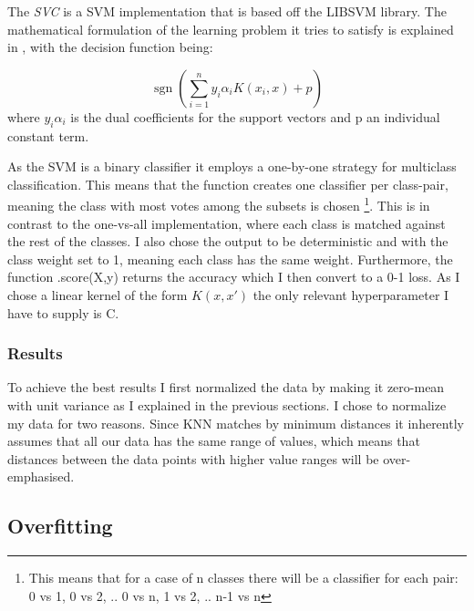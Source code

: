 \documentclass{article}
\DeclareMathOperator{\sgn}{sgn}
\theoremstyle{plain}
\theoremstyle{nonumberplain}
\begin{document}
The \textit{SVC}\cite{website:svm-sklearn} is a SVM implementation that is based off the LIBSVM \cite{website:libsvm} library.
The mathematical formulation of the learning problem it tries to satisfy is explained in \cite[1.2.7.1. SVC]{website:svm-sklearn}, with the decision function being:

\begin{equation} \label{eq7}
\sgn{(\sum_{i=1}^n y_i \alpha_i K(x_i,x) + p)}
\end{equation}
where $y_i\alpha_i$ is the dual coefficients for the support vectors and p an individual constant term.

As the SVM is a binary classifier it employs a one-by-one strategy for multiclass classification. This means that the function creates one classifier per class-pair, meaning the class with most votes among the subsets is chosen
\footnote[1]{This means that for a case of n classes there will be a classifier for each pair: 0 vs 1, 0 vs 2, .. 0 vs n, 1 vs 2, .. n-1 vs n}.
This is in contrast to the one-vs-all implementation, where each class is matched against the rest of the classes. I also chose the output to be deterministic and with the class weight set to 1, meaning each class has the same weight. Furthermore, the function .score(X,y) returns the accuracy  which I then convert to a 0-1 loss.
As I chose a linear kernel of the form $K(x,x')$ the only relevant hyperparameter I have to supply is C. 

\subsubsection{Results}
To achieve the best results I first normalized the data by making it zero-mean with unit variance as I explained in the previous sections.
I chose to normalize my data for two reasons. 
Since KNN matches by minimum distances it inherently assumes that all our data has the same range of values, which means that distances between the data points with higher value ranges will be over-emphasised. 


\subsection{Overfitting}






\end{document}
